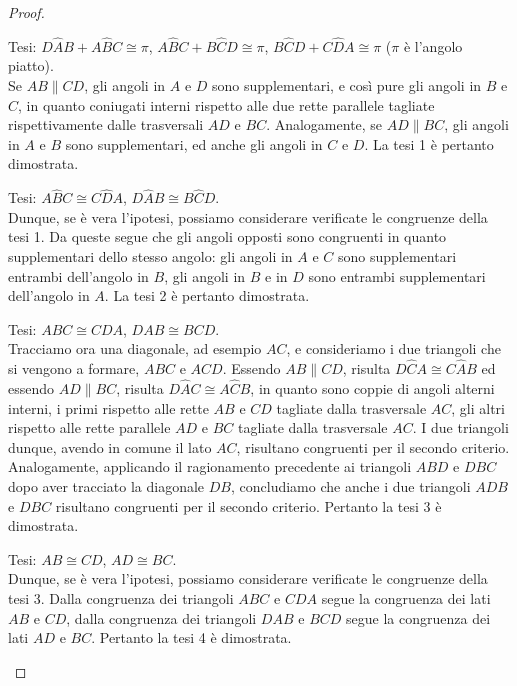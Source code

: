 \begin{proof}~\\
	\begin{enumerate*}
		
		\item Tesi: $D\widehat{A}B+A\widehat{B}C\cong\pi$, 
		$A\widehat{B}C+B\widehat{C}D\cong\pi$, 
		$B\widehat{C}D+C\widehat{D}A\cong\pi$ ($\pi$ è l'angolo piatto).\\
		Se $AB\parallel CD$, gli angoli in $A$ e $D$ sono supplementari, e 
		così pure gli angoli in $B$ e $C$, in quanto coniugati interni 
		rispetto alle due rette parallele tagliate rispettivamente dalle 
		trasversali $AD$ e $BC$. Analogamente, se $AD\parallel BC$, gli 
		angoli in $A$ e $B$ sono supplementari, ed anche gli angoli in $C$ e 
		$D$. La tesi 1 è pertanto dimostrata.
		
		\item Tesi: $A\widehat{B}C\cong C\widehat{D}A$, $D\widehat{A}B\cong 
		B\widehat{C}D$.\\
		Dunque, se è vera l'ipotesi, possiamo considerare verificate le 
		congruenze della tesi 1. Da queste segue che gli angoli opposti sono 
		congruenti in quanto supplementari dello stesso angolo: gli angoli in 
		$A$ e $C$ sono supplementari entrambi dell'angolo in $B$, gli angoli 
		in $B$ e in $D$ sono entrambi supplementari dell'angolo in $A$. La 
		tesi 2 è pertanto dimostrata.
		
		\item Tesi: $ABC\cong CDA$, $DAB\cong BCD$.\\
		Tracciamo ora una diagonale, ad esempio $AC$, e consideriamo i due 
		triangoli che si vengono a formare, $ABC$ e $ACD$. Essendo 
		$AB\parallel CD$, risulta $D\widehat{C}A\cong C\widehat{A}B$ ed 
		essendo $AD\parallel BC$, risulta $D\widehat{A}C\cong A\widehat{C}B$, 
		in quanto sono coppie di angoli alterni interni, i primi rispetto 
		alle rette $AB$ e $CD$ tagliate dalla trasversale $AC$, gli altri 
		rispetto alle rette parallele $AD$ e $BC$ tagliate dalla trasversale 
		$AC$. I due triangoli dunque, avendo in comune il lato $AC$, 
		risultano congruenti per il secondo criterio. Analogamente, applicando 
		il ragionamento precedente ai triangoli $ABD$ e $DBC$ dopo aver 
		tracciato la diagonale $DB$, concludiamo che anche i due triangoli 
		$ADB$ e $DBC$ risultano congruenti per il secondo criterio. Pertanto 
		la tesi 3 è dimostrata.
		
		\item Tesi: $AB\cong CD$, $AD\cong BC$.\\
		Dunque, se è vera l'ipotesi, possiamo considerare verificate le 
		congruenze della tesi 3. Dalla congruenza dei triangoli $ABC$ e $CDA$ 
		segue la congruenza dei lati $AB$ e $CD$, dalla congruenza dei 
		triangoli $DAB$ e $BCD$ segue la congruenza dei lati $AD$ e $BC$. 
		Pertanto la tesi 4 è dimostrata.
		

\end{enumerate*}
\end{proof}
